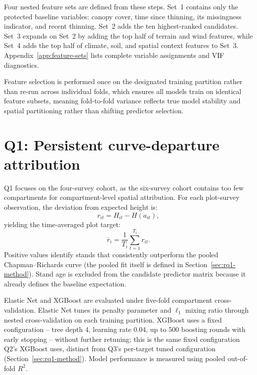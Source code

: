 Four nested feature sets are defined from these steps. Set~1 contains only the protected baseline variables: canopy cover, time since thinning, its missingness indicator, and recent thinning. Set~2 adds the ten highest-ranked candidates. Set~3 expands on Set~2 by adding the top half of terrain and wind features, while Set~4 adds the top half of climate, soil, and spatial context features to Set~3. Appendix~\ref{app:feature-sets} lists complete variable assignments and VIF diagnostics.

Feature selection is performed once on the designated training partition rather than re-run across individual folds, which ensures all models train on identical feature subsets, meaning fold-to-fold variance reflects true model stability and spatial partitioning rather than shifting predictor selection.

\section{Q1: Persistent curve-departure attribution}
\label{sec:rq2b-method}
\label{sec:q1-method}

Q1 focuses on the four-survey cohort, as the six-survey cohort contains too few compartments for compartment-level spatial attribution. For each plot-survey observation, the deviation from expected height is:
\begin{equation}
r_{it}=H_{it}-H(a_{it}),
\end{equation}
yielding the time-averaged plot target:
\begin{equation}
\bar r_i=\frac{1}{T_i}\sum_{t=1}^{T_i}r_{it}.
\label{eq:mean-cr-residual}
\end{equation}
Positive values identify stands that consistently outperform the pooled Chapman--Richards curve (the pooled fit itself is defined in Section~\ref{sec:rq1-method}). Stand age is excluded from the candidate predictor matrix because it already defines the baseline expectation.

Elastic Net and XGBoost are evaluated under five-fold compartment cross-validation. Elastic Net tunes its penalty parameter and $\ell_1$ mixing ratio through nested cross-validation on each training partition. XGBoost uses a fixed configuration -- tree depth 4, learning rate 0.04, up to 500 boosting rounds with early stopping -- without further retuning; this is the same fixed configuration Q2's XGBoost uses, distinct from Q3's per-target tuned configuration (Section~\ref{sec:rq1-method}). Model performance is measured using pooled out-of-fold $R^2$.

